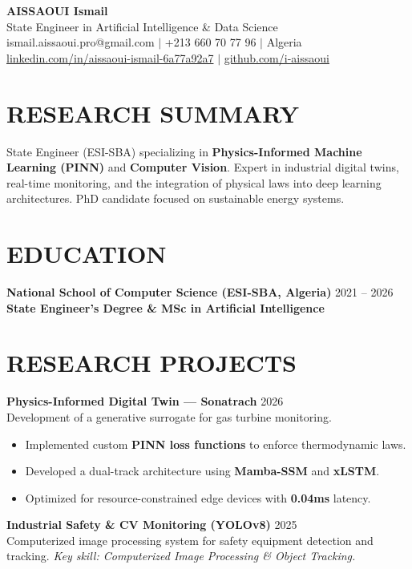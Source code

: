 \documentclass[a4paper,11pt]{article}
\begin{document}
\begin{center}
    {\Huge\bfseries\color{titleblue} AISSAOUI Ismail}\\[4pt]
    {\Large State Engineer in Artificial Intelligence \& Data Science}\\[6pt]
    ismail.aissaoui.pro@gmail.com $|$ +213 660 70 77 96 $|$ Algeria \\
    \href{https://linkedin.com/in/aissaoui-ismail-6a77a92a7}{linkedin.com/in/aissaoui-ismail-6a77a92a7} $|$ \href{https://github.com/i-aissaoui}{github.com/i-aissaoui}
\end{center}

\section{RESEARCH SUMMARY}
State Engineer (ESI-SBA) specializing in \textbf{Physics-Informed Machine Learning (PINN)} and \textbf{Computer Vision}. Expert in industrial digital twins, real-time monitoring, and the integration of physical laws into deep learning architectures. PhD candidate focused on sustainable energy systems.

\section{EDUCATION}
\textbf{National School of Computer Science (ESI-SBA, Algeria)} \hfill 2021 -- 2026 \\
\textbf{State Engineer's Degree \& MSc in Artificial Intelligence}

\section{RESEARCH PROJECTS}

\textbf{Physics-Informed Digital Twin — Sonatrach} \hfill 2026 \\
Development of a generative surrogate for gas turbine monitoring.
\begin{itemize}
    \item Implemented custom \textbf{PINN loss functions} to enforce thermodynamic laws.
    \item Developed a dual-track architecture using \textbf{Mamba-SSM} and \textbf{xLSTM}.
    \item Optimized for resource-constrained edge devices with \textbf{0.04ms} latency.
\end{itemize}

\textbf{Industrial Safety \& CV Monitoring (YOLOv8)} \hfill 2025 \\
Computerized image processing system for safety equipment detection and tracking.
\textit{Key skill: Computerized Image Processing \& Object Tracking.}
\end{document}
